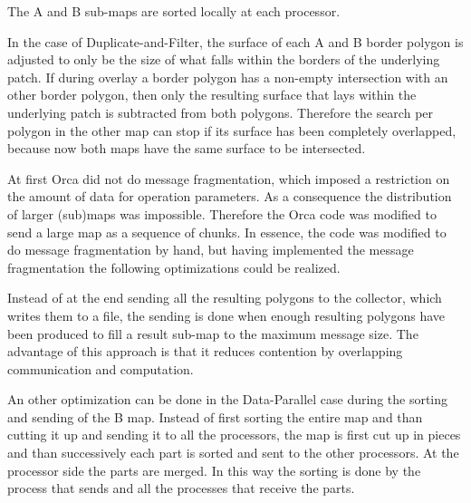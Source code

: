 The A and B sub-maps are sorted locally at each processor.

In the case of Duplicate-and-Filter, the surface of each A and B border
polygon is adjusted to only be the size of what falls within the borders of
the underlying patch.
If during overlay a border polygon has a non-empty intersection with
an other border polygon, then only the resulting surface that lays
within the underlying patch is subtracted from both polygons.
Therefore the search per polygon in the other map can stop if its surface
has been completely overlapped, because now both maps have the same surface
to be intersected.



At first Orca did not do message fragmentation, which imposed a
restriction on the amount of data for operation parameters. 
As a consequence the distribution of larger (sub)maps was impossible.
Therefore the Orca code was modified to send a large map as a sequence of
chunks.
In essence, the code was modified to do message fragmentation by hand,
but having implemented the message fragmentation the following
optimizations could be realized.

Instead of at the end sending all the resulting polygons to the
collector, which writes them to a file,
the sending is done when enough resulting polygons have been produced
to fill a result sub-map to the maximum message size.
The advantage of this approach is that it reduces contention by
overlapping communication and computation.

An other optimization can be done in the Data-Parallel case during the
sorting and sending of the B map.
Instead of first sorting the entire map and than cutting it up and
sending it to all the processors, the map is first cut up in pieces
and than successively each part is sorted and sent to the other
processors.
At the processor side the parts are merged. 
In this way the sorting is done by the process that sends and all the
processes that receive the parts.
